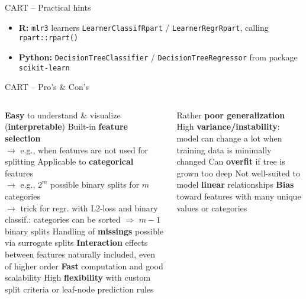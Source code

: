 \begin{frame}{CART -- Practical hints}
\medskip

\begin{itemize}
  \item \textbf{R:} \texttt{mlr3} learners \texttt{LearnerClassifRpart} / 
    \texttt{LearnerRegrRpart}, calling \texttt{rpart::rpart()}
  \item \textbf{Python:} \texttt{DecisionTreeClassifier} / 
  \texttt{DecisionTreeRegressor} from package \texttt{scikit-learn}
\end{itemize}

\end{frame}

\begin{frame}{CART -- Pro's \& Con's}

\begin{columns}[onlytextwidth]
  \begin{column}{0.5\textwidth}
    \footnotesize
    \begin{itemize}
      \positem \textbf{Easy} to understand \& visualize (\textbf{interpretable})
      \positem Built-in \textbf{feature selection}\\
      $\rightarrow$ e.g., when features are not used for splitting
      \positem Applicable to \textbf{categorical} features \\
      $\rightarrow$ e.g., $2^m$ possible binary splits for $m$ categories\\
       $\rightarrow$ trick for regr. with L2-loss and binary classif.: categories can be sorted $\Rightarrow$ $m-1$ binary splits 
      \positem Handling of \textbf{missings} possible via surrogate splits
      \positem \textbf{Interaction} effects between features naturally included, 
      even of higher order
      \positem \textbf{Fast} computation and good scalability
      \positem High \textbf{flexibility} with custom split criteria or leaf-node 
      prediction rules
    \end{itemize}
  \end{column}
  \begin{column}{0.5\textwidth}
    \footnotesize
    \begin{itemize}
      \negitem Rather \textbf{poor generalization} %
      \negitem High \textbf{variance/instability}: model can change a lot when training data is minimally changed
      \negitem Can \textbf{overfit} if tree is grown too deep
      \negitem Not well-suited to model \textbf{linear} relationships
      \negitem \textbf{Bias} toward features with many unique values or categories
    \end{itemize}
  \end{column}
\end{columns}

\vfill

\small


\end{frame}

